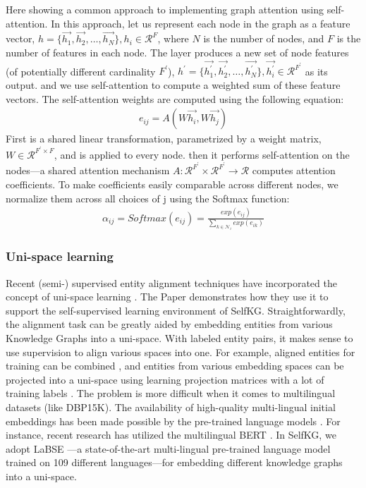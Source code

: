 \documentclass[sigconf]{acmart}
\begin{document}
{Here showing a common approach to implementing graph attention using self-attention. In this approach, let us represent each node in the graph as a feature vector, $h = \{\vec{h_1}, \vec{h_2},\dots, \vec{h_N} \},h_i \in \mathcal{R}^F$, where $N$ is the number of nodes, and $F$ is the number of features in each node. The layer produces a new set of node features (of potentially different cardinality $F^{'}$), $h^{'} =  \{\vec{h^{'}_{1}}, \vec{h^{'}_{2}},\dots, \vec{h^{'}_{N}}  \},  \vec{h^{'}_{i}} \in \mathcal{R}^{F^{'}}$ as its output. and we use self-attention to compute a weighted sum of these feature vectors. The self-attention weights are computed using the following equation:
\begin{align}
    e_{ij} = A(W\vec{h_i},W\vec{h_j})
\end{align}
First is a shared linear transformation, parametrized by a weight matrix, $W \in \mathcal{R}^{F^{'}\times F}$, and is applied to every node. then it performs self-attention on the nodes—a shared attention mechanism $A: \mathcal{R}^{F^{'}} \times \mathcal{R}^{F^{'}}\to \mathcal{R}$ computes attention coefficients. To make coefficients easily comparable across different nodes, we normalize them across all choices of j using the Softmax function:
\begin{align}
    \alpha _{ij} = Softmax(e_{ij})= \frac{exp(e_{ij})}{ \textstyle \sum_{k\in\mathcal{N}_i}exp(e_{ik})}
\end{align}
\subsubsection{Uni-space learning}
Recent (semi-) supervised entity alignment techniques have incorporated the concept of uni-space learning \cite{chen2016multilingual,tang2020bert,wang2018cross,wu2019relation}. The Paper demonstrates how they use it to support the self-supervised learning environment of SelfKG. Straightforwardly, the alignment task can be greatly aided by embedding entities from various Knowledge Graphs into a uni-space. With labeled entity pairs, it makes sense to use supervision to align various spaces into one. For example, aligned entities for training can be combined \cite{hao2016joint}, and entities from various embedding spaces can be projected into a uni-space using learning projection matrices with a lot of training labels \cite{chen2016multilingual,sun2017cross}. The problem is more difficult when it comes to multilingual datasets (like DBP15K). The availability of high-quality multi-lingual initial embeddings has been made possible by the pre-trained language models \cite{han2021pre}. For instance, recent research has utilized the multilingual BERT \cite{tang2020bert,zhang2019multi}. In SelfKG, we adopt LaBSE \cite{feng2020language}—a state-of-the-art multi-lingual pre-trained language model trained on 109 different languages—for embedding different knowledge graphs into a uni-space.
}
\end{document}

